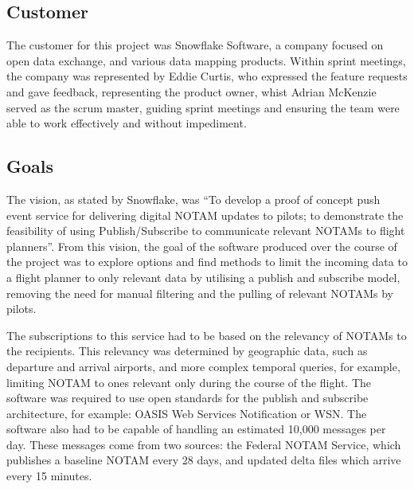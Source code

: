 \documentclass[a4paper, 12pt, twoside]{article}
\begin{document}
\subsection{Customer}
\label{sec:intro_customer}

The customer for this project was Snowflake Software, a company focused on open data exchange, and various data mapping products. Within sprint meetings, the company was represented by Eddie Curtis, who expressed the feature requests and gave feedback, representing the product owner, whist Adrian McKenzie served as the scrum master, guiding sprint meetings and ensuring the team were able to work effectively and without impediment.

\subsection{Goals}
\label{sec:intro_goals}

The vision, as stated by Snowflake, was ``To develop a proof of concept push event service for delivering digital NOTAM updates to pilots; to demonstrate the feasibility of using Publish/Subscribe to communicate relevant NOTAMs to flight planners''. From this vision, the goal of the software produced over the course of the project was to explore options and find methods to limit the incoming data to a flight planner to only relevant data by utilising a publish and subscribe model, removing the need for manual filtering and the pulling of relevant NOTAMs by pilots.

The subscriptions to this service had to be based on the relevancy of NOTAMs to the recipients. This relevancy was determined by geographic data, such as departure and arrival airports, and more complex temporal queries, for example, limiting NOTAM to ones relevant only during the course of the flight. The software was required to use open standards for the publish and subscribe architecture, for example: OASIS Web Services Notification or WSN. The software also had to be capable of handling an estimated 10,000 messages per day. These messages come from two sources: the Federal NOTAM Service, which publishes a baseline NOTAM every 28 days, and updated delta files which arrive every 15 minutes.
\end{document}
